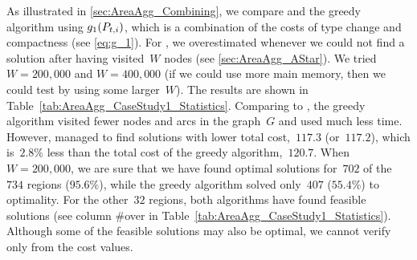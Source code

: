 \documentclass[acmsmall,natbib=false]{acmart}
\begin{document}
As illustrated in \sect\ref{sec:AreaAgg_Combining},
we compare \Astar and the greedy algorithm using $g_1(P_{t,i})$,
which is a combination of the costs 
of type change and compactness (see \eq\ref{eq:g_1}).
For \Astar, we overestimated 
whenever we could not find a solution after 
having visited~$W$ nodes 
(see \sect\ref{sec:AreaAgg_AStar}).
We tried $W=200{,}000$ and $W=400{,}000$
(if we could use more main memory, 
then we could test by using some larger~$W$). 
The results are shown in 
Table~\ref{tab:AreaAgg_CaseStudy1_Statistics}.
%
Comparing to \Astar, 
the greedy algorithm visited 
fewer nodes and arcs in the graph~$G$ 
and used much less time.
However, 
\Astar managed to find solutions with 
lower total cost,~$117.3$ (or~$117.2$), 
which is~$2.8\%$ less than 
the total cost of the greedy algorithm,~$120.7$.
%
When~$W=200{,}000$, we are sure that 
we have found optimal solutions 
for~$702$ of the~$734$ regions ($95.6\%$),
while the greedy algorithm solved 
only~$407$ ($55.4\%$) to optimality.
For the other~$32$ regions, 
both algorithms have found feasible solutions 
(see column \#over in 
Table~\ref{tab:AreaAgg_CaseStudy1_Statistics}).
Although some of the feasible solutions may also be optimal,
we cannot verify only from the cost values.
\end{document}
